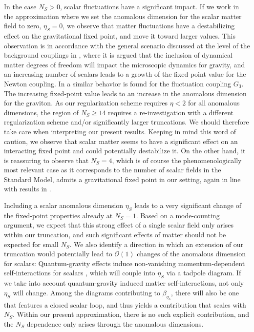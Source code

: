 \documentclass[twocolumn,prd,superscriptaddress,preprintnumbers,amsmath,amssymb,nofootinbib]{revtex4}
\begin{document}
In the case $N_S>0$, scalar fluctuations have a significant impact. If we work in the approximation where we set the anomalous dimension for the scalar matter field to zero, $\eta_S=0$, we observe that matter fluctuations  have a destabilizing effect on the gravitational fixed point, and move it toward larger values.  This observation is in accordance with the general scenario discussed at the level of the background couplings in \cite{Dona:2013qba, Dona:2014pla}, where it is argued that the inclusion of dynamical matter degrees of freedom will impact the microscopic dynamics for gravity, and an increasing number of scalars leads to a growth of the fixed point value for the Newton coupling. In \cite{Meibohm:2015twa} a similar behavior is found for the fluctuation coupling $G_3$. 
The increasing fixed-point value leads to an increase in the anomalous dimension for the graviton. 
As our regularization scheme requires $\eta<2$ for all anomalous dimensions, the region of $N_S \geq 14$ requires a re-investigation with a different regularization scheme and/or significantly larger truncations. 
We should therefore take care when interpreting our present results. Keeping in mind this word of caution, we observe that scalar matter seems to have a significant effect on an interacting fixed point and could potentially destabilize it.  On the other hand, it is reassuring to observe that $N_S=4$, which is of course the phenomenologically most relevant case as it corresponds to the number of scalar fields in the Standard Model, admits a gravitational fixed point in our setting, again in line with results in \cite{Dona:2013qba, Dona:2014pla, Meibohm:2015twa}.

Including a scalar anomalous dimension $\eta_S$ leads to a very significant change of the fixed-point properties already at $N_S=1$. 
Based on a mode-counting argument, we 
expect that this strong effect of a single scalar field only arises within our truncation, and such significant effects of matter should not be expected for small $N_S$. We also identify a direction in which an extension of our truncation would potentially lead to $\mathcal{O}(1)$ changes of the anomalous dimension for scalars: Quantum-gravity effects induce non-vanishing momentum-dependent self-interactions for scalars \cite{Eichhorn:2012va}, which will couple into $\eta_S$ via a tadpole diagram.
If we take into account quantum-gravity induced matter self-interactions, not only $\eta_S$ will change. Among the diagrams contributing to $\beta_{g_3}$, there will also be one that features a closed scalar loop, and thus yields a contribution that scales with $N_S$. Within our present approximation, there is no such explicit contribution, and the $N_S$ dependence only arises through the anomalous dimensions.
\end{document}
